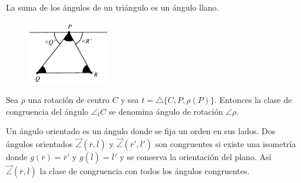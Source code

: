  La suma de los ángulos de un triángulo es un ángulo llano.

\begin{figure}[H]
	\centering
	\includegraphics[width=3.5cm]{figuras/4-41.png}
	\vspace{-1em}
\end{figure}

 Sea $\rho$ una rotación de centro $C$ y sea $t = \triangle\{C, P, \rho(P) \}$. Entonces la clase de congruencia del ángulo $\angle_t C$ se denomina ángulo de rotación $\angle\rho$.

 Un ángulo orientado es un ángulo donde se fija un orden en sus lados. Dos ángulos orientados $\overrightarrow{\angle}(\overline{r}, \overline{l})$ y  $\overrightarrow{\angle}(\overline{r}', \overline{l}')$ son congruentes si existe una isometría donde $g(\overline{r}) = \overline{r}'$ y $g(\overline{l}) = \overline{l}'$ y se conserva la orientación del plano. Así $\overrightarrow{\angle}(\overline{r}, \overline{l})$ la clase de congruencia con todos los ángulos congruentes.










